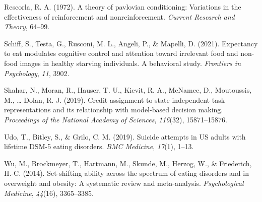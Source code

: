 \documentclass[
  man,floatsintext]{apa6}
\newlength{\cslhangindent}
\newlength{\cslentryspacingunit} %
\newenvironment{CSLReferences}[2] %
 {%
  \setlength{\parindent}{0pt}
  \ifodd #1
  \let\oldpar\par
  \def\par{\hangindent=\cslhangindent\oldpar}
  \fi
  \setlength{\parskip}{#2\cslentryspacingunit}
 }%
 {}
\begin{document}
\begin{CSLReferences}{1}{0}
\leavevmode{}%
Rescorla, R. A. (1972). A theory of pavlovian conditioning: Variations in the effectiveness of reinforcement and nonreinforcement. \emph{Current Research and Theory}, 64--99.

\leavevmode{}%
Schiff, S., Testa, G., Rusconi, M. L., Angeli, P., \& Mapelli, D. (2021). Expectancy to eat modulates cognitive control and attention toward irrelevant food and non-food images in healthy starving individuals. A behavioral study. \emph{Frontiers in Psychology}, \emph{11}, 3902.

\leavevmode{}%
Shahar, N., Moran, R., Hauser, T. U., Kievit, R. A., McNamee, D., Moutoussis, M., \ldots{} Dolan, R. J. (2019). Credit assignment to state-independent task representations and its relationship with model-based decision making. \emph{Proceedings of the National Academy of Sciences}, \emph{116}(32), 15871--15876.

\leavevmode{}%
Udo, T., Bitley, S., \& Grilo, C. M. (2019). Suicide attempts in US adults with lifetime DSM-5 eating disorders. \emph{BMC Medicine}, \emph{17}(1), 1--13.

\leavevmode{}%
Wu, M., Brockmeyer, T., Hartmann, M., Skunde, M., Herzog, W., \& Friederich, H.-C. (2014). Set-shifting ability across the spectrum of eating disorders and in overweight and obesity: A systematic review and meta-analysis. \emph{Psychological Medicine}, \emph{44}(16), 3365--3385.

\end{CSLReferences}
\end{document}
